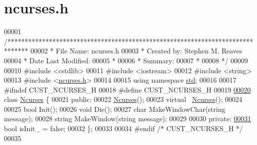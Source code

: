 \hypertarget{ncurses_8h_source}{}\section{ncurses.\+h}

\begin{DoxyCode}
00001 \textcolor{comment}{/******************************************************************************}
00002 \textcolor{comment}{ * File Name: ncurses.h}
00003 \textcolor{comment}{ * Created by: Stephen M. Reaves}
00004 \textcolor{comment}{ * Date Last Modified:}
00005 \textcolor{comment}{ *}
00006 \textcolor{comment}{ * Summary:}
00007 \textcolor{comment}{ *}
00008 \textcolor{comment}{ */}
00009 
00010 \textcolor{preprocessor}{#include <cstdlib>}
00011 \textcolor{preprocessor}{#include <iostream>}
00012 \textcolor{preprocessor}{#include <string>}
00013 \textcolor{preprocessor}{#include <\mbox{\hyperlink{ncurses_8h}{ncurses.h}}>}
00014 
00015 \textcolor{keyword}{using namespace }\mbox{\hyperlink{namespacestd}{std}};
00016 
00017 \textcolor{preprocessor}{#ifndef CUST\_NCURSES\_H}
00018 \textcolor{preprocessor}{#define CUST\_NCURSES\_H}
00019 
\mbox{\hyperlink{classNcurses}{00020}} \textcolor{keyword}{class }\mbox{\hyperlink{classNcurses}{Ncurses}} \{
00021   \textcolor{keyword}{public}:
00022     \mbox{\hyperlink{classNcurses}{Ncurses}}();
00023     \textcolor{keyword}{virtual} ~\mbox{\hyperlink{classNcurses}{Ncurses}}();
00024 
00025     \textcolor{keywordtype}{bool} Init();
00026     \textcolor{keywordtype}{void} Die();
00027     \textcolor{keywordtype}{char} MakeWindowChar(\textcolor{keywordtype}{string} message);
00028     \textcolor{keywordtype}{string} MakeWindow(\textcolor{keywordtype}{string} message);
00029 
00030   \textcolor{keyword}{private}:
\mbox{\hyperlink{classNcurses_adce6b18f601709b3843fb36fa7b91764}{00031}}     \textcolor{keywordtype}{bool} isInit\_ = \textcolor{keyword}{false};
00032 \};
00033 
00034 \textcolor{preprocessor}{#endif }\textcolor{comment}{/* CUST\_NCURSES\_H */}\textcolor{preprocessor}{}
00035 
\end{DoxyCode}
